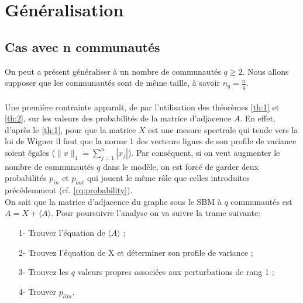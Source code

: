 \section{Généralisation}
\subsection{Cas avec n communautés}
On peut a présent généraliser à un nombre de communautés $q \geq 2$.
Nous allons supposer que les communautés sont de même taille, à savoir $n_q = \frac{n}{q}$.
\paragraph{}\label{rq:contrainte model}
Une première contrainte apparaît, de par l'utilisation des théorèmes \ref{th:1} et \ref{th:2}, sur les valeurs des probabilités de la matrice d'adjacence $A$.
En effet, d'après le \autoref{th:1}, pour que la matrice $X$ est une mesure spectrale qui tende vers la loi de Wigner il faut que la norme 1 des vecteurs lignes de son profile de variance soient égales ($\parallel x \parallel_1 = \sum_{j=1}^{n}|x_j|$).
Par conséquent, si on veut augmenter le nombre de communautés $q$ dans le modèle, on est forcé de garder deux probabilités $p_{in}$ et $p_{out}$ qui jouent le même rôle que celles introduites précédemment (cf. \ref{rq:probability}).\\

On sait que la matrice d’adjacence du graphe sous le SBM à $q$ communautés est $A = X + \langle A \rangle$.  
Pour poursuivre l'analyse on va suivre la trame suivante:
\begin{itemize}
	\item[1-] Trouver l'équation de $\langle A \rangle$ ;
	\item[2-] Trouvez l'équation de X et déterminer son profile de variance ;
	\item[3-] Trouvez les $q$ valeurs propres associées aux perturbations de rang 1 ;
	\item[4-] Trouver $p_{lim}$.\\
\end{itemize}

